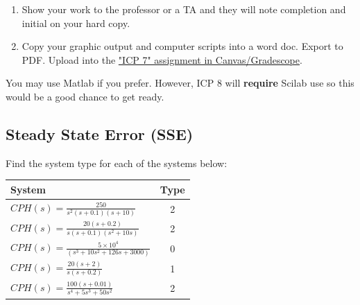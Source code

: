 \documentclass{article}	%
\begin{document}
\begin{enumerate}
  \item Show your work to the professor or a TA and they will note completion and initial on your hard copy.
  \item Copy your graphic output and computer scripts into a word doc.  Export to PDF.  Upload into the \href{https://canvas.uw.edu/courses/1116153/assignments/3823644}{"ICP 7" assignment in Canvas/Gradescope}.
\end{enumerate}

You may use Matlab if you prefer.   However, ICP 8 will {\bf require} Scilab use so this would be a good chance to get ready.


\subsection{Steady State Error (SSE)}
Find the system type for each of the systems below:

\renewcommand\arraystretch{2.0}%
%
\begin{tabular}{|l|c|}  \hline
System							& Type \\ \hline
$CPH(s) = \frac{250}        {s^2(s+0.1)(s+10)}$		&  2   \\ \hline
$CPH(s) = \frac{20(s+0.2)}  {s(s+0.1)(s^2+10s)}$	&  2   \\ \hline
$CPH(s) = \frac{5\times10^4}{(s^3+10s^2+126s+3000)}$	&  0   \\ \hline
$CPH(s) = \frac{20(s+2)}    {s(s+0.2)}$			&  1   \\ \hline
$CPH(s) = \frac{100(s+0.01)}{s^4+5s^3+50s^2}$		&  2   \\ \hline
\end{tabular}
\end{document}
